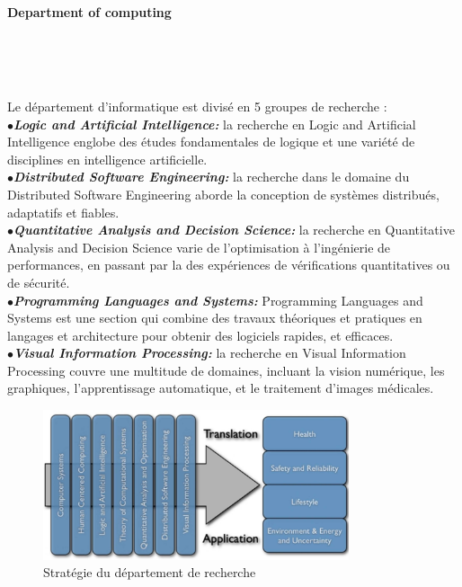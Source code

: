 \documentclass[10pt]{report}
\begin{document}
	\paragraph{Department of computing}~\par~\par
	Le département d'informatique est divisé en 5 groupes de recherche : %
	\\{$\bullet$}\textit{\textbf{Logic and Artificial Intelligence:}} la recherche en Logic and Artificial Intelligence englobe des études fondamentales de logique et une variété de disciplines en intelligence artificielle.
	\\{$\bullet$}\textit{\textbf{Distributed Software Engineering:}}	la recherche dans le domaine du Distributed Software Engineering aborde la conception de systèmes distribués, adaptatifs et fiables.
	\\{$\bullet$}\textit{\textbf{Quantitative Analysis and Decision Science:}} la recherche en Quantitative Analysis and Decision Science varie de l'optimisation à l'ingénierie de performances, en passant par la des expériences de vérifications quantitatives ou de sécurité.
	\\{$\bullet$}\textit{\textbf{Programming Languages and Systems:}} Programming Languages and Systems est une section qui combine des travaux théoriques et pratiques en langages et architecture pour obtenir des logiciels rapides, et efficaces.
	\\{$\bullet$}\textit{\textbf{Visual Information Processing:}} la recherche en Visual Information Processing couvre une multitude de domaines, incluant la vision numérique, les graphiques, l'apprentissage automatique, et le traitement d'images médicales. 
	\begin{figure}
		\includegraphics[width=9cm]{Reports/figures/research_strategy.jpg}
		\caption{Stratégie du département de recherche}
		\label{Stratégie du département de recherche}
	\end{figure}~\par~\par
	
\end{document}
